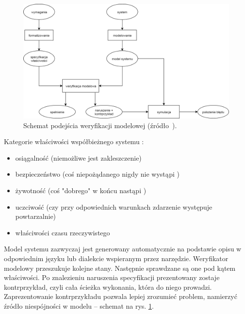 \vspace{0.5cm}
\begin{figure}[h]
    \centering
    \includegraphics[width=\textwidth,keepaspectratio]{img/model_checking_approach_schematic_view.png}
    \caption{Schemat podejścia weryfikacji modelowej (źródło~\cite{Bai08}).}
    \label{fig:model_checking_scheme}
\end{figure}

\noindent
Kategorie właściwości współbieżnego systemu \cite{Bai08}:
\begin{itemize}
\item osiągalność (niemożliwe jest zakleszczenie)
\item bezpieczeństwo (coś niepożądanego nigdy nie wystąpi \cite{Alp87})
\item żywotność (coś "dobrego" w końcu nastąpi \cite{Alp85})
\item uczciwość (czy przy odpowiednich warunkach zdarzenie występuje powtarzalnie)
\item właściwości czasu rzeczywistego
\end{itemize}

\vspace{0.5cm}
Model systemu zazwyczaj jest generowany automatycznie na podstawie opisu w odpowiednim języku lub dialekcie wspieranym przez narzędzie. 
Weryfikator modelowy przeszukuje kolejne stany.
Następnie sprawdzane są one pod kątem właściwości.
Po znalezieniu naruszenia specyfikacji prezentowany zostaje kontrprzykład, czyli cała ścieżka wykonania, która do niego prowadzi.
Zaprezentowanie kontrprzykładu pozwala lepiej zrozumieć problem, namierzyć źródło niespójności w modelu -- schemat na rys. \ref{fig:model_checking_scheme}.

